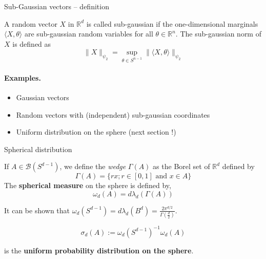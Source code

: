 \documentclass{beamer}
\begin{document}
  \begin{frame}{Sub-Gaussian vectors -- definition}
    \begin{definition} A random vector $X$ in
      $\mathbb{R}^{d}$ is called sub-gaussian if the one-dimensional marginals
      $\langle X, \theta \rangle$ are sub-gaussian random variables for all $\theta \in \mathbb{R}^{n} .$ The sub-gaussian norm of $X$ is defined as
      $$
      \|X\|_{\psi_{2}}=\sup _{\theta \in S^{n-1}}\|\langle X, \theta\rangle\|_{\psi_{2}}
      $$

    \end{definition}

    \paragraph{Examples.}

    \begin{itemize}
    \item Gaussian vectors
    \item Random vectors with (independent) sub-gaussian coordinates
    \item Uniform distribution on the sphere (next section !)
    \end{itemize}
  \end{frame}

  \begin{frame}{Spherical distribution}

    \begin{definition}
      If $A \in \mathcal{B}\left(S^{d-1}\right)$, we define the \emph{wedge}
      $\Gamma(A)$ as the Borel set
      of $\mathbb{R}^{d}$ defined by
      $$
      \Gamma(A)=\{r x ; r \in[0,1] \text { and } x \in A\}
      $$
      The \textbf{spherical measure} on the sphere is defined by,
      $$
      \omega_{d}(A)=d \lambda_{d}(\Gamma(A))
      $$
    \end{definition}

    \pause

    It can be shown that $\omega_d(S^{d-1}) = d\lambda_d(B^d)  = \frac{2 \pi^{d /
        2}}{\Gamma\left(\frac{d}{2}\right)} $.

    \begin{equation*}
      \sigma_{d}(A):= \omega_d(S^{d-1})^{-1} \omega_d(A)
    \end{equation*}

    is the \textbf{uniform probability distribution on the sphere}.

  \end{frame}
\end{document}
